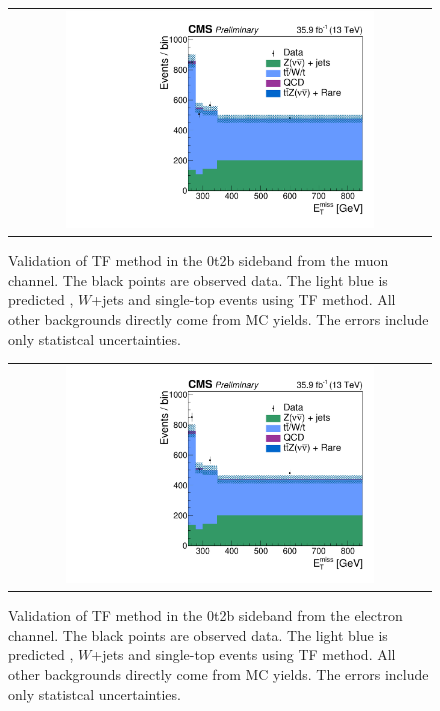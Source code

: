 \begin{figure}[htbp]
  \begin{center}
  \begin{tabular}{c}
  \includegraphics[angle=0,width=0.75\textwidth]{sections/mc4/Backgrounds/TF/figures/stack_2b0t_mu.pdf}
  \end{tabular}
  \caption{Validation of TF method in the 0t2b sideband from the muon channel. The black points are observed data. The light blue is predicted \ttbar, $W$+jets and single-top events using TF method. All other backgrounds directly come from MC yields. The errors include only statistcal uncertainties.}
    \label{fig:val_0t2b_mu}
  \end{center}
\end{figure}

\begin{figure}[htbp]
  \begin{center}
  \begin{tabular}{c}
  \includegraphics[angle=0,width=0.75\textwidth]{sections/mc4/Backgrounds/TF/figures/stack_2b0t_el.pdf}
  \end{tabular}
  \caption{Validation of TF method in the 0t2b sideband from the electron channel. The black points are observed data. The light blue is predicted \ttbar, $W$+jets and single-top events using TF method. All other backgrounds directly come from MC yields. The errors include only statistcal uncertainties.}
    \label{fig:val_0t2b_el}
  \end{center}
\end{figure}

